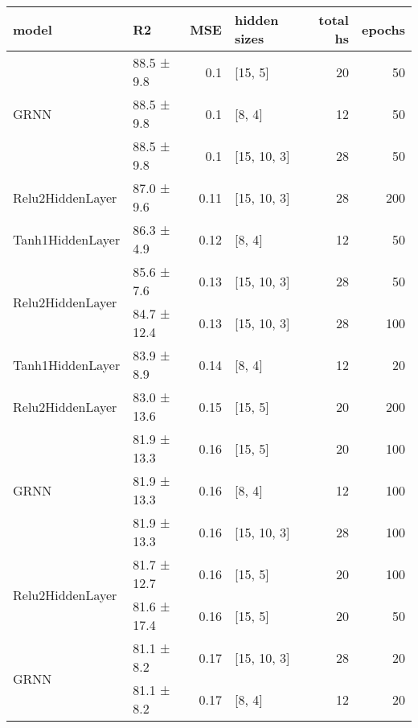 
    \begin{table*}[h]
        \centering
        \begin{tabular}{llrlrr}
\hline
 model                                      & R2          &   MSE & hidden sizes   &   total hs &   epochs \\
\hline
 \hline
\multirow{3}{*}{GRNN}               & 88.5 ± 9.8  &  0.1  & [15, 5]        &         20 &       50 \\
                                            & 88.5 ± 9.8  &  0.1  & [8, 4]         &         12 &       50 \\
                                            & 88.5 ± 9.8  &  0.1  & [15, 10, 3]    &         28 &       50 \\
 \hline
Relu2HiddenLayer                    & 87.0 ± 9.6  &  0.11 & [15, 10, 3]    &         28 &      200 \\
 \hline
Tanh1HiddenLayer                    & 86.3 ± 4.9  &  0.12 & [8, 4]         &         12 &       50 \\
 \hline
\multirow{2}{*}{Relu2HiddenLayer}   & 85.6 ± 7.6  &  0.13 & [15, 10, 3]    &         28 &       50 \\
                                            & 84.7 ± 12.4 &  0.13 & [15, 10, 3]    &         28 &      100 \\
 \hline
Tanh1HiddenLayer                    & 83.9 ± 8.9  &  0.14 & [8, 4]         &         12 &       20 \\
 \hline
Relu2HiddenLayer                    & 83.0 ± 13.6 &  0.15 & [15, 5]        &         20 &      200 \\
 \hline
\multirow{3}{*}{GRNN}               & 81.9 ± 13.3 &  0.16 & [15, 5]        &         20 &      100 \\
                                            & 81.9 ± 13.3 &  0.16 & [8, 4]         &         12 &      100 \\
                                            & 81.9 ± 13.3 &  0.16 & [15, 10, 3]    &         28 &      100 \\
 \hline
\multirow{2}{*}{Relu2HiddenLayer}   & 81.7 ± 12.7 &  0.16 & [15, 5]        &         20 &      100 \\
                                            & 81.6 ± 17.4 &  0.16 & [15, 5]        &         20 &       50 \\
 \hline
\multirow{3}{*}{GRNN}               & 81.1 ± 8.2  &  0.17 & [15, 10, 3]    &         28 &       20 \\
                                            & 81.1 ± 8.2  &  0.17 & [8, 4]         &         12 &       20 \\

\end{tabular}
\end{table*}
